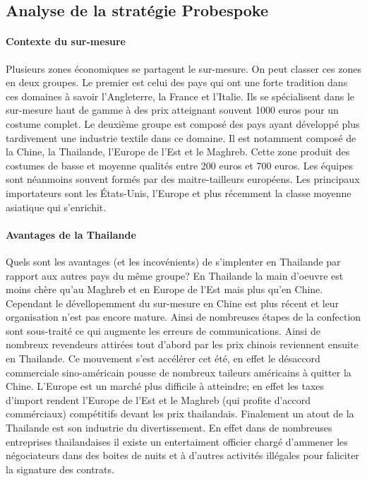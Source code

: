 \subsection{Analyse de la stratégie Probespoke}
\paragraph{Contexte du sur-mesure}
 Plusieurs zones économiques se partagent le sur-mesure. On peut classer ces zones en deux groupes. Le premier est celui des pays qui ont une forte tradition dans ces domaines à savoir l'Angleterre, la France et l'Italie. Ils se spécialisent dans le sur-mesure haut de gamme à des prix atteignant souvent 1000 euros pour un costume complet. Le deuxième groupe est composé des pays ayant développé plus tardivement une industrie textile dans ce domaine. Il est notamment composé de la Chine, la Thailande, l'Europe de l'Est et le Maghreb. Cette zone produit des costumes de basse et moyenne qualités entre 200 euros et 700 euros. Les équipes sont néanmoins souvent formés par des maitre-tailleurs européens.  Les principaux importateurs sont les États-Unis, l'Europe et plus récemment la classe moyenne asiatique qui s'enrichit.
\paragraph{Avantages de la Thailande} Quels sont les avantages (et les incovénients) de s'implenter en Thailande par rapport aux autres pays du même groupe? En Thailande la main d'oeuvre est moins chère qu'au Maghreb et en Europe de l'Est mais plus qu'en Chine. Cependant le dévellopemment du sur-mesure en Chine est plus récent et leur organisation n'est pas encore mature. Ainsi de nombreuses étapes de la confection sont sous-traité ce qui augmente les erreurs de communications. Ainsi de nombreux revendeurs attirées tout d'abord par les prix chinois reviennent ensuite en Thailande. Ce mouvement s'est accélérer cet été, en effet le désaccord commerciale sino-américain pousse de nombreux taileurs américains à quitter la Chine. L'Europe est un marché plus difficile à atteindre; en effet les taxes d'import rendent l'Europe de l'Est et le Maghreb (qui profite d'accord commérciaux) compétitifs devant les prix thailandais. Finalement un atout de la Thailande est son industrie du divertissement. En effet dans de nombreuses entreprises thailandaises il existe un entertaiment officier chargé d'ammener les négociateurs dans des boites de nuits et à d'autres activités illégales pour faliciter la signature des contrats.
